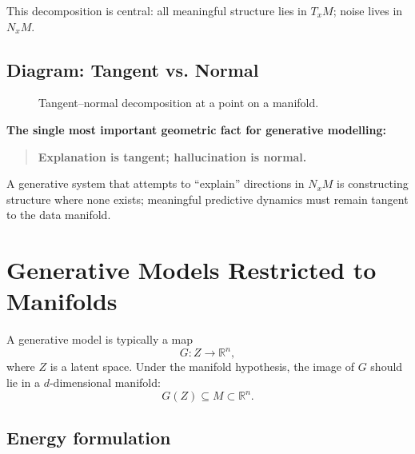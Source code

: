 \documentclass[11pt,a4paper,twocolumn]{article}
\begin{document}
This decomposition is central: all meaningful structure lies in $T_x M$; noise lives in $N_x M$.

\subsection{Diagram: Tangent vs. Normal}

\begin{figure}[H]
\centering
{}
\caption{Tangent–normal decomposition at a point on a manifold.}
\end{figure}

\medskip
\noindent\textbf{The single most important geometric fact for generative modelling:}

\begin{quote}
\textbf{Explanation is tangent; hallucination is normal.}
\end{quote}

A generative system that attempts to ``explain'' directions in $N_x M$ is constructing structure where none exists; meaningful predictive dynamics must remain tangent to the data manifold.


\section{Generative Models Restricted to Manifolds}

A generative model is typically a map
\[
G : Z \to \mathbb{R}^n,
\]
where $Z$ is a latent space.  
Under the manifold hypothesis, the image of $G$ should lie in a
$d$-dimensional manifold:
\[
G(Z) \subseteq M \subset \mathbb{R}^n.
\]

\subsection{Energy formulation}
\end{document}
